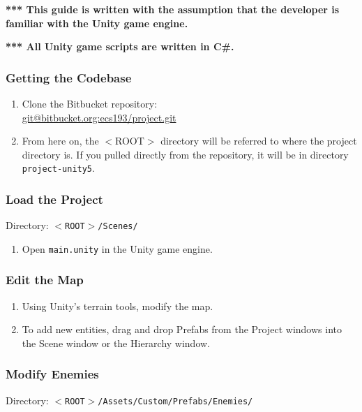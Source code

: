 \documentclass[a4paper]{refart}
\begin{document}
\textbf{*** This guide is written with the assumption that the developer is familiar with the Unity game engine.}

\textbf{*** All Unity game scripts are written in C\#.}

\subsubsection{Getting the Codebase}

\begin{enumerate}
	\item Clone the Bitbucket repository:\\ \url{git@bitbucket.org:ecs193/project.git}
	\item From here on, the $<$ROOT$>$ directory will be referred to where the project directory is. If you pulled directly from the repository, it will be in directory \texttt{project-unity5}.
\end{enumerate}

\subsubsection{Load the Project}

Directory: \texttt{$<$ROOT$>$/Scenes/}

\begin{enumerate}
	\item Open \texttt{main.unity} in the Unity game engine.
\end{enumerate}

\subsubsection{Edit the Map}

\begin{enumerate}
	\item Using Unity's terrain tools, modify the map.
	\item To add new entities, drag and drop Prefabs from the Project windows into the Scene window or the Hierarchy window.
\end{enumerate}

\subsubsection{Modify Enemies}

Directory: \texttt{$<$ROOT$>$/Assets/Custom/Prefabs/Enemies/}
\end{document}
